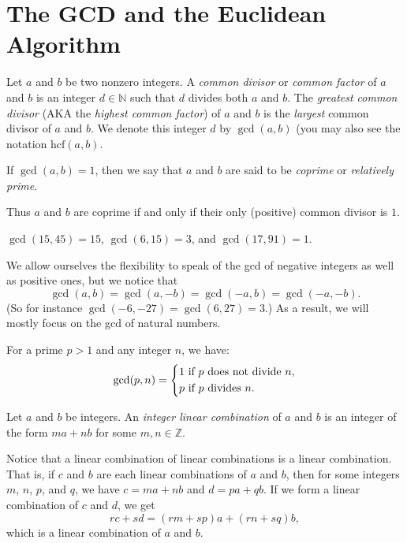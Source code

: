 \documentclass[11pt,dvipsnames]{book}
\def\Z{\mathbb{Z}}
\def\N{{\mathbb{N}}}
\numberwithin{equation}{section} %
\numberwithin{figure}{section} %
\numberwithin{table}{section} %
\begin{document}
\section{The GCD and the Euclidean Algorithm}

\begin{definition}
Let $a$ and $b$ be two nonzero integers.
A \emph{common divisor} or \emph{common factor} of $a$ and $b$ is an integer $d \in \N$ such that $d$ divides both $a$ and $b$.
The {\it greatest common divisor} (AKA the {\it highest common factor}) of $a$ and $b$ is the \emph{largest} common divisor of $a$ and $b$.
We denote this integer $d$ by $\gcd(a,b)$ (you may also see the notation $\mathrm{hcf}(a,b)$.

If $\gcd(a,b)=1$, then we say that $a$ and $b$ are said to be {\it coprime} or {\it relatively prime}.
\end{definition}

Thus $a$ and $b$ are coprime if and only if their only (positive) common divisor is $1$.

\begin{example} $\gcd(15,45)=15$, 
$\gcd(6,15)=3$, and $\gcd(17,91)=1$.
\end{example}

\begin{example}
We allow ourselves the flexibility to speak of the gcd of negative integers as well as positive ones, but we notice that
\[
\gcd(a,b) = \gcd(a,-b) = \gcd(-a,b) = \gcd(-a,-b).
\]
(So for instance $\gcd(-6,-27) = \gcd(6, 27) = 3$.)
As a result, we will mostly focus on the gcd of natural numbers.
\end{example}

For a prime $p>1$ and any integer $n$, we have:
$$
\gcd(p,n) = \left\{\aligned%
&1\ \text{if $p$ does not divide $n$},\\
&p\ \text{if $p$  divides $n$}.\\
\endaligned
\right.
$$

\begin{definition}
Let $a$ and $b$ be integers.
An \emph{integer linear combination} of $a$ and $b$ is an integer of the form $ma + nb$ for some $m,n \in \Z$.
\end{definition}

Notice that a linear combination of linear combinations is a linear combination.
That is, if $c$ and $b$ are each linear combinations of $a$ and $b$, then for some integers $m$, $n$, $p$, and $q$, we have $c = m a + n b$ and $d = p a + q b$.
If we form a linear combination of $c$ and $d$, we get
\[
r c + s d = (rm+sp)a + (rn+sq)b,
\]
which is a linear combination of $a$ and $b$.
\end{document}
